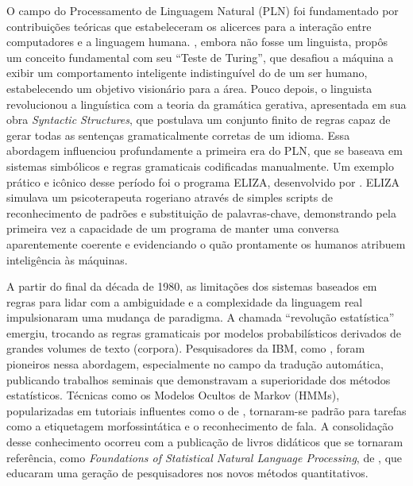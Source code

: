 O campo do Processamento de Linguagem Natural (PLN) foi fundamentado por contribuições teóricas que estabeleceram os alicerces para a interação entre computadores e a linguagem humana. , embora não fosse um linguista, propôs um conceito fundamental com seu ``Teste de Turing'', que desafiou a máquina a exibir um comportamento inteligente indistinguível do de um ser humano, estabelecendo um objetivo visionário para a área. Pouco depois, o linguista  revolucionou a linguística com a teoria da gramática gerativa, apresentada em sua obra \emph{Syntactic Structures}, que postulava um conjunto finito de regras capaz de gerar todas as sentenças gramaticalmente corretas de um idioma. Essa abordagem influenciou profundamente a primeira era do PLN, que se baseava em sistemas simbólicos e regras gramaticais codificadas manualmente. Um exemplo prático e icônico desse período foi o programa ELIZA, desenvolvido por . ELIZA simulava um psicoterapeuta rogeriano através de simples scripts de reconhecimento de padrões e substituição de palavras-chave, demonstrando pela primeira vez a capacidade de um programa de manter uma conversa aparentemente coerente e evidenciando o quão prontamente os humanos atribuem inteligência às máquinas.

A partir do final da década de 1980, as limitações dos sistemas baseados em regras para lidar com a ambiguidade e a complexidade da linguagem real impulsionaram uma mudança de paradigma. A chamada ``revolução estatística'' emergiu, trocando as regras gramaticais por modelos probabilísticos derivados de grandes volumes de texto (corpora). Pesquisadores da IBM, como , foram pioneiros nessa abordagem, especialmente no campo da tradução automática, publicando trabalhos seminais que demonstravam a superioridade dos métodos estatísticos. Técnicas como os Modelos Ocultos de Markov (HMMs), popularizadas em tutoriais influentes como o de , tornaram-se padrão para tarefas como a etiquetagem morfossintática e o reconhecimento de fala. A consolidação desse conhecimento ocorreu com a publicação de livros didáticos que se tornaram referência, como \emph{Foundations of Statistical Natural Language Processing}, de , que educaram uma geração de pesquisadores nos novos métodos quantitativos.

